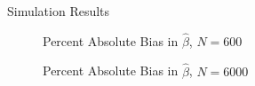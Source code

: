 \documentclass[structurebold,final,hyperref=pdftex,bookmarks,colorlinks,breaklinks]{beamer}
\begin{document}
\begin{frame}
\begin{columns}[t]
\begin{column}{0.24\linewidth}
\begin{block}{Simulation Results}
        \begin{figure}[h]
        \begin{center}
        Percent Absolute Bias in $\hat{\beta}$, $N=600$ \\
        \end{center}
        \end{figure}

        \begin{figure}[h]
        \begin{center}
        Percent Absolute Bias in $\hat{\beta}$, $N=6000$ \\
        \end{center}
        \end{figure}


\end{block}
\end{column}
\end{columns}
\end{frame}
\end{document}
